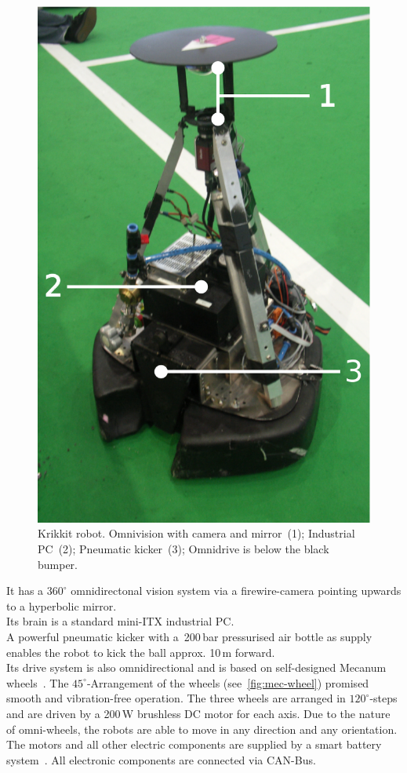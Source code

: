 \documentclass[12pt,a4paper]{article}
\begin{document}
\begin{figure}[ht]
\begin{center}
\includegraphics[width=0.5\columnwidth]{figures/krikkit}
\caption{\label{fig:krikkit}
Krikkit robot. Omnivision with camera and mirror~(1); Industrial PC~(2); Pneumatic kicker~(3); Omnidrive is below the black bumper.
}
\end{center}
\end{figure}

It has a $360^\circ$ omnidirectonal vision system via a firewire-camera pointing upwards to a hyperbolic mirror.\\
Its brain is a standard mini-ITX industrial PC.\\
A powerful pneumatic kicker with a~200\,bar pressurised air bottle as supply enables the robot to kick the ball approx. 10\,m forward.\\
Its drive system is also omnidirectional and is based on self-designed Mecanum wheels~\cite{mecanum2007}. 
The $45^\circ$-Arrangement of the wheels (see~\autoref{fig:mec-wheel}) promised smooth and vibration-free operation.
The three wheels are arranged in $120^\circ$-steps and are driven by a 200\,W brushless DC motor for each axis. 
Due to the nature of omni-wheels, the robots are able to move in any direction and any orientation.\\
The motors and all other electric components are supplied by a smart battery system~\cite{krammer06}.
All electronic components are connected via CAN-Bus.
\end{document}
